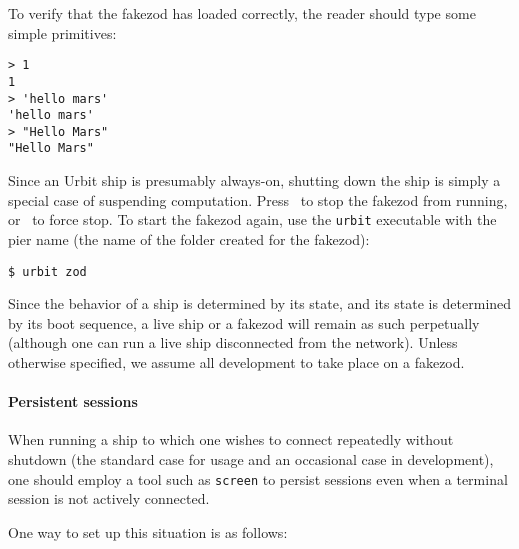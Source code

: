{{{{
To verify that the fakezod has loaded correctly, the reader should type some simple primitives:

\begin{lstlisting}[style=nonumbers]
> 1
1
> 'hello mars'
'hello mars'
> "Hello Mars"
"Hello Mars"
\end{lstlisting}

Since an Urbit ship is presumably always-on, shutting down the ship is simply a special case of suspending computation.  Press \CtrlD~to stop the fakezod from running, or \CtrlZ~to force stop.  To start the fakezod again, use the \texttt{urbit} executable with the pier name (the name of the folder created for the fakezod):

\begin{lstlisting}[style=nonumbers]
$ urbit zod
\end{lstlisting}

Since the behavior of a ship is determined by its state, and its state is determined by its boot sequence, a live ship or a fakezod will remain as such perpetually (although one can run a live ship disconnected from the network).  Unless otherwise specified, we assume all development to take place on a fakezod.

\paragraph{Persistent sessions}

When running a ship to which one wishes to connect repeatedly without shutdown (the standard case for usage and an occasional case in development), one should employ a tool such as \texttt{screen} to persist sessions even when a terminal session is not actively connected.

One way to set up this situation is as follows:

}}}}
